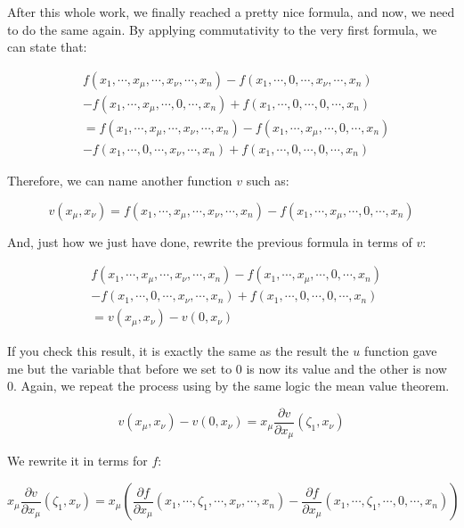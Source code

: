 \documentclass[12pt]{article}
\begin{document}
	After this whole work, we finally reached a pretty nice formula, and now, we need to do the same again. By applying commutativity to the very first formula, we can state that:
	
	\[
		\begin{aligned}
			& f(x_1, \cdots, x_\mu, \cdots, x_\nu, \cdots, x_n) - f(x_1, \cdots, 0, \cdots, x_\nu, \cdots, x_n) 
			\\
			& - f(x_1, \cdots, x_\mu, \cdots, 0, \cdots, x_n) + f(x_1, \cdots, 0, \cdots, 0, \cdots, x_n)
			\\
			& = f(x_1, \cdots, x_\mu, \cdots, x_\nu, \cdots, x_n) - f(x_1, \cdots, x_\mu, \cdots, 0, \cdots, x_n)
			\\
			& - f(x_1, \cdots, 0, \cdots, x_\nu, \cdots, x_n) + f(x_1, \cdots, 0, \cdots, 0, \cdots, x_n)
		\end{aligned}
	\]
	
	Therefore, we can name another function $v$ such as:
	
	\[
		v(x_\mu, x_\nu) = f(x_1, \cdots, x_\mu, \cdots, x_\nu, \cdots, x_n) - f(x_1, \cdots, x_\mu, \cdots, 0, \cdots, x_n)
	\]
	
	And, just how we just have done, rewrite the previous formula in terms of $v$:
	
	\[
		\begin{aligned}
			& f(x_1, \cdots, x_\mu, \cdots, x_\nu, \cdots, x_n) - f(x_1, \cdots, x_\mu, \cdots, 0, \cdots, x_n)
			\\
			& - f(x_1, \cdots, 0, \cdots, x_\nu, \cdots, x_n) + f(x_1, \cdots, 0, \cdots, 0, \cdots, x_n)
			\\
			& = v(x_\mu, x_\nu) - v(0, x_\nu)
		\end{aligned}
	\]
	
	If you check this result, it is exactly the same as the result the $u$ function gave me but the variable that before we set to 0 is now its value and the other is now 0. Again, we repeat the process using by the same logic the mean value theorem.
	
	\[
		v(x_\mu, x_\nu) - v(0, x_\nu) = x_\mu \frac{\partial v}{\partial x_\mu}(\zeta_1, x_\nu)
	\]
	
	We rewrite it in terms for $f$:
	
	\[
		x_\mu \frac{\partial v}{\partial x_\mu}(\zeta_1, x_\nu)
		= x_\mu \left( \frac{\partial f}{\partial x_\mu}(x_1, \cdots, \zeta_1,\cdots, x_\nu, \cdots, x_n) - \frac{\partial f}{\partial x_\mu}(x_1, \cdots, \zeta_1, \cdots, 0, \cdots, x_n) \right)
	\]
	
\end{document}
